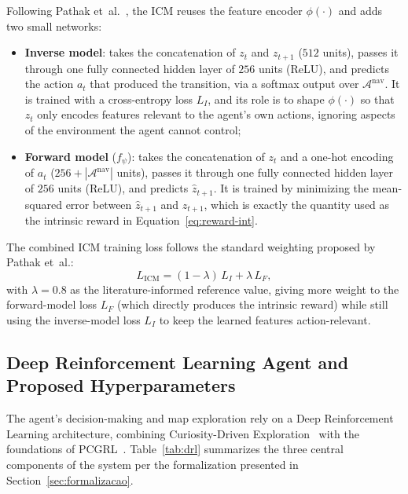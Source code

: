 \documentclass[sigconf,nonacm,language=english]{acmart}
\begin{document}
Following Pathak et~al.~\cite{pathak2017curiosity}, the ICM reuses the
feature encoder $\phi(\cdot)$ and adds two small networks:
\begin{itemize}
  \item \textbf{Inverse model}: takes the concatenation of $z_t$ and
    $z_{t+1}$ ($512$ units), passes it through one fully connected hidden
    layer of $256$ units (ReLU), and predicts the action $a_t$ that
    produced the transition, via a softmax output over
    $\mathcal{A}^{\text{nav}}$. It is trained with a cross-entropy loss
    $L_I$, and its role is to shape $\phi(\cdot)$ so that $z_t$ only
    encodes features relevant to the agent's own actions, ignoring
    aspects of the environment the agent cannot control;
  \item \textbf{Forward model} ($f_\psi$): takes the concatenation of $z_t$
    and a one-hot encoding of $a_t$ ($256 + |\mathcal{A}^{\text{nav}}|$
    units), passes it through one fully connected hidden layer of $256$
    units (ReLU), and predicts $\hat{z}_{t+1}$. It is trained by minimizing
    the mean-squared error between $\hat{z}_{t+1}$ and $z_{t+1}$, which is
    exactly the quantity used as the intrinsic reward in
    Equation~\eqref{eq:reward-int}.
\end{itemize}
The combined ICM training loss follows the standard weighting proposed by
Pathak et~al.:
\begin{equation}
  L_{\text{ICM}} = (1-\lambda)\, L_I + \lambda\, L_F,
  \label{eq:icm-loss}
\end{equation}
with $\lambda = 0.8$ as the literature-informed reference value, giving
more weight to the forward-model loss $L_F$ (which directly produces the
intrinsic reward) while still using the inverse-model loss $L_I$ to keep
the learned features action-relevant.

\subsection{Deep Reinforcement Learning Agent and Proposed Hyperparameters}
\label{sec:drl-hparams}

The agent's decision-making and map exploration rely on a Deep
Reinforcement Learning architecture, combining Curiosity-Driven
Exploration~\cite{pathak2017curiosity} with the foundations of
PCGRL~\cite{khalifa2020pcgrl}. Table~\ref{tab:drl} summarizes the three
central components of the system per the formalization presented in
Section~\ref{sec:formalizacao}.
\end{document}
